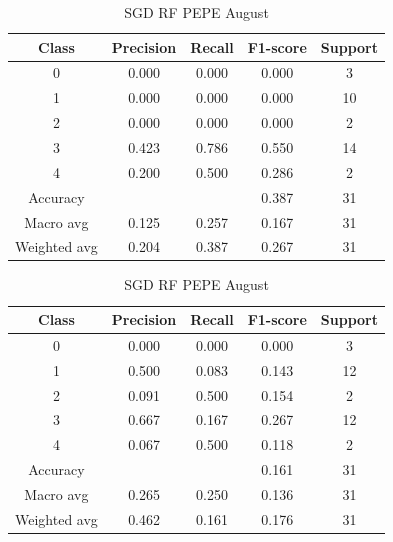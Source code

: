 \begin{enumerate}
\begin{enumerate}
                \begin{table}[H]
                \centering
                \scriptsize
                \begin{minipage}{0.48\textwidth}
                \centering
                \begin{tabular}{c|cccc}
                \hline
                Class & Precision & Recall & F1-score & Support \\
                \hline
                0 & 0.000 & 0.000 & 0.000 & 3 \\
                1 & 0.000 & 0.000 & 0.000 & 10 \\
                2 & 0.000 & 0.000 & 0.000 & 2 \\
                3 & 0.423 & 0.786 & 0.550 & 14 \\
                4 & 0.200 & 0.500 & 0.286 & 2 \\
                \hline
                Accuracy &       &      & 0.387 & 31 \\
                Macro avg & 0.125 & 0.257 & 0.167 & 31 \\
                Weighted avg & 0.204 & 0.387 & 0.267 & 31 \\
                \hline
                \end{tabular}
                \caption{SGD RF DOGE August}
                \label{tab:classifier_2_report_sgd_rf_doge_non_filtered_aug}
                \end{minipage}
                \hfill
                \begin{minipage}{0.48\textwidth}
                \centering
                \begin{tabular}{c|cccc}
                \hline
                Class & Precision & Recall & F1-score & Support \\
                \hline
                0 & 0.000 & 0.000 & 0.000 & 3 \\
                1 & 0.500 & 0.083 & 0.143 & 12 \\
                2 & 0.091 & 0.500 & 0.154 & 2 \\
                3 & 0.667 & 0.167 & 0.267 & 12 \\
                4 & 0.067 & 0.500 & 0.118 & 2 \\
                \hline
                Accuracy &       &      & 0.161 & 31 \\
                Macro avg & 0.265 & 0.250 & 0.136 & 31 \\
                Weighted avg & 0.462 & 0.161 & 0.176 & 31 \\
                \hline
                \end{tabular}
                \caption{SGD RF PEPE August}
                \label{tab:classifier_2_report_sgd_rf_pepe_non_filtered_aug}
                \end{minipage}
                

\end{table}
\end{enumerate}
\end{enumerate}
